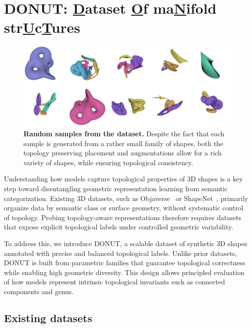 \section{DONUT: \underline{D}ataset \underline{O}f ma\underline{N}ifold str\underline{U}c\underline{T}ures}
\label{sec:topogen}

\begin{figure}[t]
  \centering
  \includegraphics[width=1.0\linewidth]{figs/topogen/samples_overview.png}

  \label{fig:topogen-samples}
  \caption{\textbf{Random samples from the dataset.} Despite the fact that each sample is generated from a rather small family of shapes, both the topology preserving placement and augmentations allow for a rich variety of shapes, while ensuring topological consistency.}
  \label{fig:short}
\end{figure}


Understanding how models capture topological properties of 3D shapes is a key step toward disentangling geometric representation learning from semantic categorization. Existing 3D datasets, such as Objaverse~\cite{objaverse,objaverse_xl} or ShapeNet~\cite{shapenet}, primarily organize data by semantic class or surface geometry, without systematic control of topology. Probing topology-aware representations therefore requires datasets that expose explicit topological labels under controlled geometric variability.

To address this, we introduce DONUT, a scalable dataset of synthetic 3D shapes annotated with precise and balanced topological labels. Unlike prior datasets, DONUT is built from parametric families that guarantee topological correctness while enabling high geometric diversity. This design allows principled evaluation of how models represent intrinsic topological invariants such as connected components and genus.

\subsection{Existing datasets}
\label{ssec:existing_datasets}

